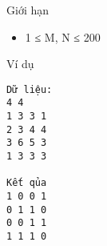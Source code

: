 Giới hạn  
\begin{itemize}
	\item     1 ≤ M, N ≤ 200   
\end{itemize}
   Ví dụ  
\begin{verbatim}
Dữ liệu:
4 4
1 3 3 1
2 3 4 4
3 6 5 3
1 3 3 3

Kết qủa
1 0 0 1
0 1 1 0
0 0 1 1
1 1 1 0
\end{verbatim}